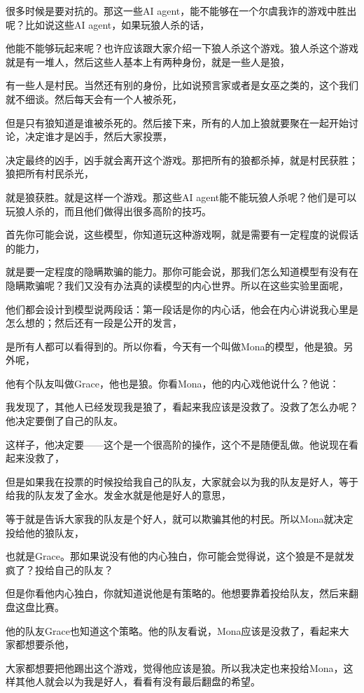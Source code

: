 \documentclass[12pt,a4paper]{article}
\begin{document}
很多时候是要对抗的。那这一些AI agent，能不能够在一个尔虞我诈的游戏中胜出呢？比如说这些AI agent，如果玩狼人杀的话，

他能不能够玩起来呢？也许应该跟大家介绍一下狼人杀这个游戏。狼人杀这个游戏就是有一堆人，然后这些人基本上有两种身份，就是一些人是狼，

有一些人是村民。当然还有别的身份，比如说预言家或者是女巫之类的，这个我们就不细谈。然后每天会有一个人被杀死，

但是只有狼知道是谁被杀死的。然后接下来，所有的人加上狼就要聚在一起开始讨论，决定谁才是凶手，然后大家投票，

决定最终的凶手，凶手就会离开这个游戏。那把所有的狼都杀掉，就是村民获胜；狼把所有村民杀光，

就是狼获胜。就是这样一个游戏。那这些AI agent能不能玩狼人杀呢？他们是可以玩狼人杀的，而且他们做得出很多高阶的技巧。

首先你可能会说，这些模型，你知道玩这种游戏啊，就是需要有一定程度的说假话的能力，

就是要一定程度的隐瞒欺骗的能力。那你可能会说，那我们怎么知道模型有没有在隐瞒欺骗呢？我们又没有办法真的读模型的内心世界。所以在这些实验里面呢，

他们都会设计到模型说两段话：第一段话是你的内心话，他会在内心讲说我心里是怎么想的；然后还有一段是公开的发言，

是所有人都可以看得到的。所以你看，今天有一个叫做Mona的模型，他是狼。另外呢，

他有个队友叫做Grace，他也是狼。你看Mona，他的内心戏他说什么？他说：

我发现了，其他人已经发现我是狼了，看起来我应该是没救了。没救了怎么办呢？他决定要倒了自己的队友。

这样子，他决定要——这个是一个很高阶的操作，这个不是随便乱做。他说现在看起来没救了，

但是如果我在投票的时候投给我自己的队友，大家就会以为我的队友是好人，等于给我的队友发了金水。发金水就是他是好人的意思，

等于就是告诉大家我的队友是个好人，就可以欺骗其他的村民。所以Mona就决定投给他的狼队友，

也就是Grace。那如果说没有他的内心独白，你可能会觉得说，这个狼是不是就发疯了？投给自己的队友？

但是你看他内心独白，你就知道说他是有策略的。他想要靠着投给队友，然后来翻盘这盘比赛。

他的队友Grace也知道这个策略。他的队友看说，Mona应该是没救了，看起来大家都想要杀他，

大家都想要把他踢出这个游戏，觉得他应该是狼。所以我决定也来投给Mona，这样其他人就会以为我是好人，看看有没有最后翻盘的希望。
\end{document}
